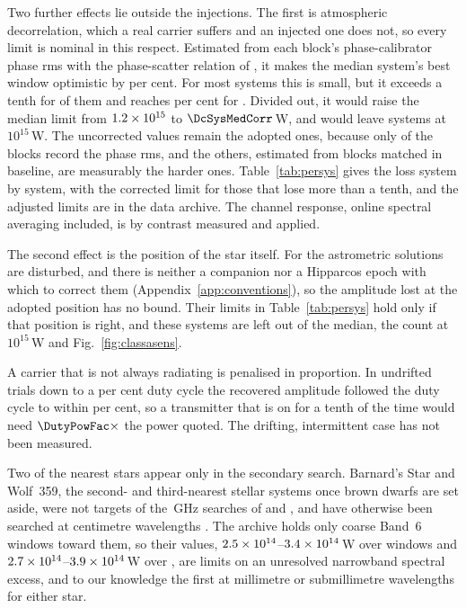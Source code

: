 Two further effects lie outside the injections. The first is atmospheric
decorrelation, which a real carrier suffers and an injected one does not, so
every limit is nominal in this respect. Estimated from each block's
phase-calibrator phase rms \citep[\S\S10.4.11, 11.3.1]{ALMAHandbook} with the
phase-scatter relation of \citet[Eq.~3]{Richards2022}, it makes the median
system's best window optimistic by \NmDecSysMedPct{} per cent. For most
systems this is small, but it exceeds a tenth for \NmDecNBigSys{} of them and
reaches \NmDecSysWorstPct{} per cent for \NmDecSysWorstName. Divided out, it
would raise the median limit from $1.2\times10^{15}$ to
$\DcSysMedCorr$\,W, and would leave
\NmDecAdjNEfifteen{} systems at $10^{15}$\,W. The
uncorrected values remain the adopted ones, because only \SensDecorNBlk{} of
the \SensDecorNBlkTot{} blocks record the phase rms, and the others,
estimated from blocks matched in baseline, are measurably the harder ones.
Table~\ref{tab:persys} gives the loss system by system, with the
corrected limit for those that lose more than a tenth,
and the adjusted limits are in the data archive. The
channel response, online spectral averaging included, is by contrast
measured and applied.

The second effect is the position of the star itself. For \OmFlagStars{} the
astrometric solutions are disturbed, and there is neither a companion nor a
Hipparcos epoch with which to correct them
(Appendix~\ref{app:conventions}), so the amplitude lost at the adopted
position has no bound. Their limits in Table~\ref{tab:persys} hold only if
that position is right, and these \OmNFlagWord{} systems are left out of the
median, the count at $10^{15}$\,W and Fig.~\ref{fig:classasens}.

A carrier that is not always radiating is penalised in proportion. In
\DutyNTrial{} undrifted trials down to a \DutyCycleMinPct{} per cent duty
cycle the recovered amplitude followed the duty cycle to within
\DutyAttenDevPct{} per cent, so a transmitter that is on for a tenth of the
time would need $\DutyPowFac\times$ the power quoted. The drifting,
intermittent case has not been measured.

Two of the nearest stars appear only in the secondary search. Barnard's
Star and Wolf~359, the second- and third-nearest stellar systems once brown
dwarfs are set aside, were not targets of the \SbPriorFreqGHz\,GHz searches
of \citet{Steffes1994} and \citet{Mauersberger1996}, and have otherwise been
searched at centimetre wavelengths \citep{Enriquez2017,Price2020,Margot2023}.
The archive holds only coarse Band~6 windows toward them, so their values,
$2.5\times10^{14}$--$3.4\times10^{14}$\,W over \NWinBarn{} windows and
$2.7\times10^{14}$--$3.9\times10^{14}$\,W over \NWinWolf, are limits on an
unresolved narrowband spectral excess, and to our knowledge the first at
millimetre or submillimetre wavelengths for either star.

